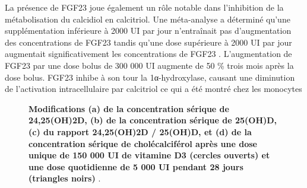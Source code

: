 \documentclass[
  a4paper,
  DIV=11,
  numbers=noendperiod,
  listof=totoc]{scrreprt}
\begin{document}
La présence de \ac{FGF23} joue également un rôle notable dans
l'inhibition de la métabolisation du calcidiol en calcitriol. Une
méta-analyse a déterminé qu'une supplémentation inférieure à 2000 UI par
jour n'entraînait pas d'augmentation des concentrations de \ac{FGF23}
tandis qu'une dose supérieure à 2000 UI par jour augmentait
significativement les concentrations de \ac{FGF23}
\autocite{Griffin.2021}. L'augmentation de \ac{FGF23} par une dose bolus
de 300 000 UI augmente de 50 \% trois mois après la dose bolus.
\ac{FGF23} inhibe à son tour la 1α-hydroxylase, causant une diminution
de l'activation intracellulaire par calcitriol ce qui a été montré chez
les monocytes \autocite{Griffin.2021}

\begin{figure}


\caption[Modifications (a) de la concentration sérique de 24,25(OH)2D,
(b) de la concentration sérique de 25(OH)D, (c) du rapport 24,25(OH)2D /
25(OH)D, et (d) de la concentration sérique de cholécalciférol après une
dose unique de 150 000 UI de vitamine D3 (cercles ouverts) et une dose
quotidienne de 5 000 UI pendant 28 jours (triangles
noirs).]{\label{fig-24-hydroxylase}\textbf{Modifications (a) de la
concentration sérique de 24,25(OH)2D, (b) de la concentration sérique de
25(OH)D, (c) du rapport 24,25(OH)2D / 25(OH)D, et (d) de la
concentration sérique de cholécalciférol après une dose unique de 150
000 UI de vitamine D3 (cercles ouverts) et une dose quotidienne de 5 000
UI pendant 28 jours (triangles noirs)} \autocite{Ketha.2018}.}

\end{figure}%
\end{document}
